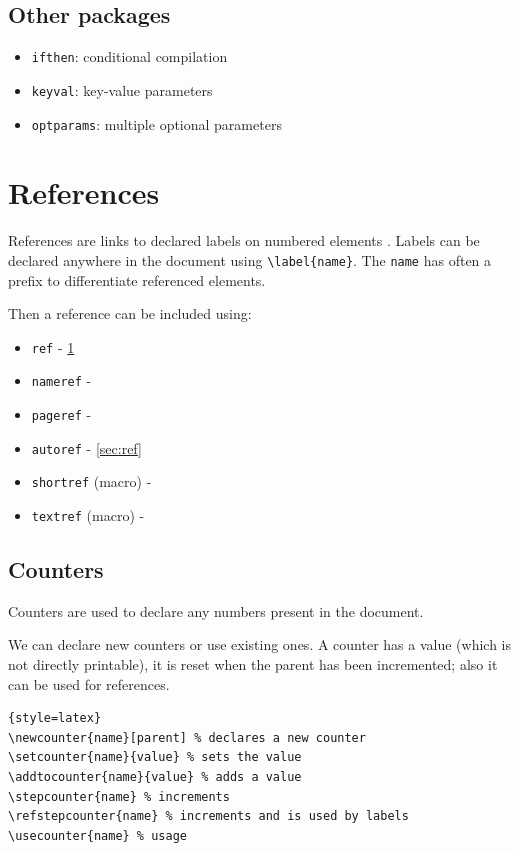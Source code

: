 \subsection*{Other packages}
\begin{itemize}
\item \texttt{ifthen}: conditional compilation
\item \texttt{keyval}: key-value parameters
\item \texttt{optparams}: multiple optional parameters
\end{itemize}

\section{References}
\label{sec:ref}

References are links to declared labels on numbered elements .
Labels can be declared anywhere in the document using \lstinline$\label{name}$.
The \texttt{name} has often a prefix to differentiate referenced elements.

Then a reference can be included using:
\begin{itemize}
\item \texttt{ref} - \ref{sec:ref}
\item \texttt{nameref} - 
\item \texttt{pageref} - \pageref{sec:ref}
\item \texttt{autoref} - \autoref{sec:ref}
\item \texttt{shortref} (macro) - 
\item \texttt{textref} (macro) - 
\end{itemize}

\subsection{Counters}

Counters are used to declare any numbers present in the document.

We can declare new counters or use existing ones.
A counter has a value (which is not directly printable), it is reset when the
parent has been incremented; also it can be used for references.
\begin{lstlisting}{style=latex}
\newcounter{name}[parent] % declares a new counter
\setcounter{name}{value} % sets the value
\addtocounter{name}{value} % adds a value
\stepcounter{name} % increments
\refstepcounter{name} % increments and is used by labels
\usecounter{name} % usage
\end{lstlisting}

